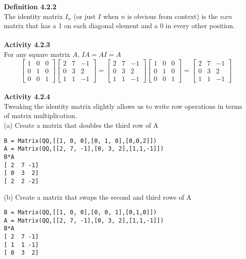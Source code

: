 \documentclass{article}
\begin{document}
\textbf{Definition 4.2.2}\\The identity matrix $I_n$ (or just $I$ when $n$ is obvious from context) is the $n x n$ matrix that has a 1 on each diagonal element and a 0 in every other position.\\
\\
\textbf{Activity 4.2.3}\\
For any square matrix $A$, $IA = AI = A$
\begin{equation*}
\left[\begin{array}{ccc} 1 & 0 & 0 \\ 0 & 1 & 0 \\ 0 & 0 & 1 \end{array}\right]
\left[\begin{array}{ccc} 2 & 7 & -1 \\ 0 & 3 & 2 \\ 1 & 1 & -1 \end{array}\right]
=
\left[\begin{array}{ccc} 2 & 7 & -1 \\ 0 & 3 & 2 \\ 1 & 1 & -1 \end{array}\right]
\left[\begin{array}{ccc} 1 & 0 & 0 \\ 0 & 1 & 0 \\ 0 & 0 & 1 \end{array}\right]
=
\left[\begin{array}{ccc} 2 & 7 & -1 \\ 0 & 3 & 2 \\ 1 & 1 & -1 \end{array}\right]
\end{equation*}
\\
\textbf{Activity 4.2.4}\\
Tweaking the identity matrix slightly allows us to write row operations in terms of matrix multiplication.\\
(a) Create a matrix that doubles the third row of A
\begin{verbatim}
B = Matrix(QQ,[[1, 0, 0],[0, 1, 0],[0,0,2]])
A = Matrix(QQ,[[2, 7, -1],[0, 3, 2],[1,1,-1]])
B*A
[ 2  7 -1]
[ 0  3  2]
[ 2  2 -2]
\end{verbatim}
(b) Create a matrix that swaps the second and third rows of A
\begin{verbatim}
B = Matrix(QQ,[[1, 0, 0],[0, 0, 1],[0,1,0]])
A = Matrix(QQ,[[2, 7, -1],[0, 3, 2],[1,1,-1]])
B*A
[ 2  7 -1]
[ 1  1 -1]
[ 0  3  2]
\end{verbatim}
\end{document}
